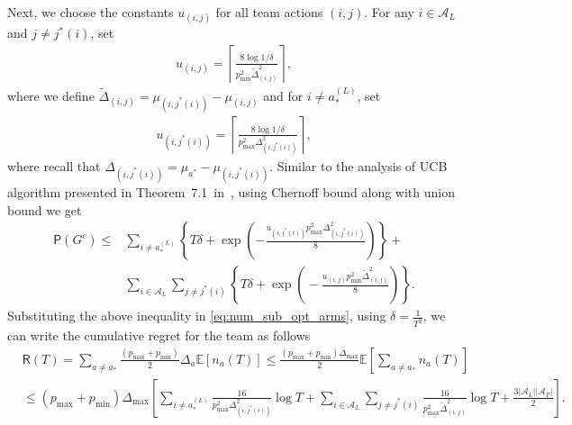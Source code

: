 \documentclass[letterpaper]{article} %
\theoremstyle{definition}
\def\expe{\mathbb{E}}   %
\def\P{\mathsf{P}}   %
\def\reg{\mathsf{R}}
\def\mc{\mathcal}
\begin{document}
Next, we choose the constants $u_{(i,j)}$ for all team actions $(i,j)$. For any $i \in \mc{A}_L$ and $j \neq j^{\ast}(i)$, set 
\begin{align}
    u_{(i,j)} = \left\lceil\frac{8\log 1/\delta}{p^2_{\text{min}}\tilde{\Delta}^2_{(i,j)}} \right\rceil,
\end{align}
where we define $\tilde{\Delta}_{(i,j)} = \mu_{(i,j^{\ast}(i))}- \mu_{(i,j)}$ and for $i \neq a^{(L)}_{\ast}$, set
\begin{align}
    u_{(i,j^{\ast}(i))} = \left\lceil\frac{8\log 1/\delta}{p^2_{\text{max}}\Delta^2_{(i,j^{\ast}(i))}} \right\rceil,
\end{align}
where recall that $\Delta_{(i,j^{\ast}(i))} = \mu_{a^{\ast}}- \mu_{(i,j^{\ast}(i))}$. Similar to the analysis of UCB algorithm presented in Theorem~7.1~in~\cite{lattimore_szepesvari_2020}, using Chernoff bound along with union bound we get
\begin{align}
    \P(G^c) 
    \leq & \sum_{i \neq a^{(L)}_{\ast}} \left\{T\delta + \exp\left( -\frac{u_{(i,j^{\ast}(i))}p^2_{\text{max}} \Delta^2_{(i,j^{\ast}(i))} }{8}\right)\right\} + \\
    &\sum_{i \in \mc{A}_L}\sum_{j \neq j^{\ast}(i)}\! \left\{T\delta + \exp\left(\! -\frac{u_{(i,j)}p^2_{\text{min}}\tilde{\Delta}^2_{(i,j)} }{8}\!\right)\right\}.
\end{align}
Substituting the above inequality in \eqref{eq:num_sub_opt_arms}, using $\delta = \frac{1}{T^2}$, we can write the cumulative regret for the team as follows 
\begin{align}
    &\reg(T) 
    = \sum_{a \neq a_{\ast}}\frac{(p_{\text{max}}+p_{\text{min}})}{2}\Delta_a \expe[n_{a}(T)] \leq \frac{(p_{\text{max}}+p_{\text{min}})\Delta_{\text{max}}}{2} \expe\left[\sum_{a \neq a_{\ast}}n_{a}(T)\right] 
    \\
    &\leq 
    (p_{\text{max}}+p_{\text{min}})\Delta_{\text{max}}\left[\sum_{i \neq a^{(L)}_{\ast}} \frac{16}{p^2_{\text{max}}\Delta^2_{(i, j^{\ast}(i))}} \log T + \sum_{i \in \mc{A}_L} \sum_{j \neq j^{\ast}(i)}\frac{16}{p^2_{\text{max}}\tilde{\Delta}^2_{(i, j)}}  \log T + \frac{3\lvert\mc{A}_L\rvert\lvert\mc{A}_F\rvert}{2}\right].
\end{align}

%
\end{document}
